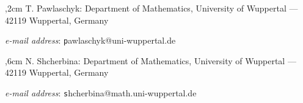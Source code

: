 \documentclass[11pt,a4paper]{article}
\begin{document}
%
%
%
%
%
%
,2cm  
{\sc T. Pawlaschyk: Department of Mathematics, University of Wuppertal --- 42119 Wuppertal, Germany}
  
{\em e-mail address}: {\texttt pawlaschyk@uni-wuppertal.de}

,6cm   
{\sc N. Shcherbina: Department of Mathematics, University of Wuppertal --- 42119 Wuppertal, Germany}
  
{\em e-mail address}: {\texttt shcherbina@math.uni-wuppertal.de} 
\end{document}
